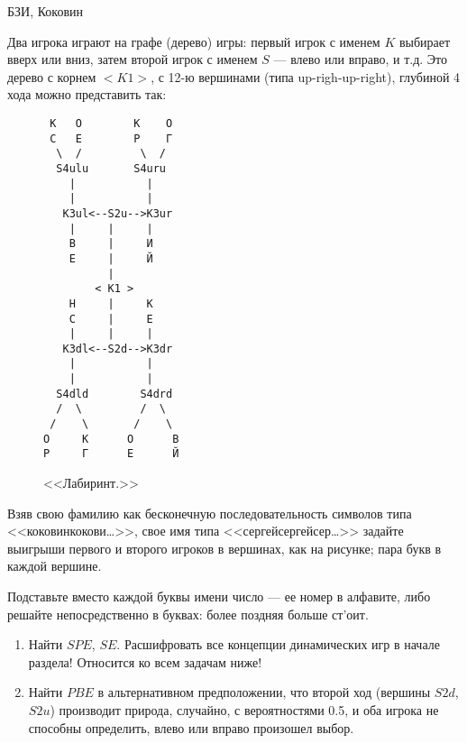 \begin{problem}[<<Лабиринт>>.]
\begin{source}
БЗИ, Коковин
\end{source}  Два игрока играют на графе
(дерево) игры: первый игрок с именем $K$ выбирает вверх или
вниз, затем второй игрок с именем $S$ --- влево или вправо, и
т.д. Это дерево с корнем $<K1>$, с 12-ю вершинами (типа
up-righ-up-right), глубиной 4 хода можно представить так:

\begin{figure}[ht]
\begin{verbatim} 
 К   О        К    О
 С   Е        Р    Г
  \  /         \  /
  S4ulu       S4uru
    |           |
    |           |
   K3ul<--S2u-->K3ur
    |     |     |
    В     |     И
    Е     |     Й
          |
        < K1 >
    Н     |     К
    С     |     Е
    |     |     |
   K3dl<--S2d-->K3dr
    |           |
    |           |
  S4dld        S4drd
  /  \         /  \
 /    \       /    \
О     К      О      В
Р     Г      Е      Й
\end{verbatim}
\caption{<<Лабиринт.>>}
\end{figure}

Взяв свою фамилию как бесконечную последовательность символов
типа <<коковинкокови\ldots >>, свое имя типа
<<сергейсергейсер\ldots >> задайте выигрыши первого и второго
игроков в вершинах, как на рисунке; пара букв в каждой
вершине.

Подставьте вместо каждой буквы имени число --- ее номер в
алфавите, либо решайте непосредственно в буквах: более
поздняя больше ст'оит.

\begin{enumerate}

\item Найти $SPE$, $SE$. {\red Расшифровать все концепции динамических игр в начале раздела! Относится ко всем задачам ниже!}

\item Найти $PBE$ в альтернативном
предположении, что второй ход (вершины $S2d$, $S2u$)
производит природа, случайно, с вероятностями 0.5, и оба
игрока не способны определить, влево или вправо произошел
выбор.
\end{enumerate}





\begin{sol}

\end{sol}
\end{problem}





